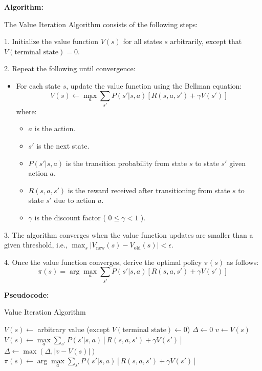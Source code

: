 \documentclass{article}
\begin{document}
\textbf{Algorithm:}

The Value Iteration Algorithm consists of the following steps:

1. Initialize the value function \( V(s) \) for all states \( s \) arbitrarily, except that \( V(\text{terminal state}) = 0 \).

2. Repeat the following until convergence:
   \begin{itemize}
       \item For each state \( s \), update the value function using the Bellman equation:
       \[
       V(s) \leftarrow \max_a \sum_{s'} P(s' | s, a) [R(s, a, s') + \gamma V(s')]
       \]
       where:
       \begin{itemize}
           \item \( a \) is the action.
           \item \( s' \) is the next state.
           \item \( P(s' | s, a) \) is the transition probability from state \( s \) to state \( s' \) given action \( a \).
           \item \( R(s, a, s') \) is the reward received after transitioning from state \( s \) to state \( s' \) due to action \( a \).
           \item \( \gamma \) is the discount factor ( \( 0 \leq \gamma < 1 \) ).
       \end{itemize}
   \end{itemize}

3. The algorithm converges when the value function updates are smaller than a given threshold, i.e., \( \max_s | V_{\text{new}}(s) - V_{\text{old}}(s) | < \epsilon \).

4. Once the value function converges, derive the optimal policy \( \pi(s) \) as follows:
   \[
   \pi(s) = \arg\max_a \sum_{s'} P(s' | s, a) [R(s, a, s') + \gamma V(s')]
   \]

\textbf{Pseudocode:}

\begin{algorithm}
\caption{Value Iteration Algorithm}
    \begin{algorithmic}[1]
             
                \State $V(s) \gets$ arbitrary value (except $V(\text{terminal state}) \gets 0$)
            \EndFor
            \Repeat
                \State $\Delta \gets 0$
                    \State $v \gets V(s)$
                    \State $V(s) \gets \max\limits_a \sum\limits_{s'} P(s' | s, a) [R(s, a, s') + \gamma V(s')]$
                    \State $\Delta \gets \max(\Delta, |v - V(s)|)$
                \EndFor
            \Until{$\Delta < \epsilon$}
             
                \State $\pi(s) \gets \arg\max\limits_a \sum\limits_{s'} P(s' | s, a) [R(s, a, s') + \gamma V(s')]$
            \EndFor
        \EndProcedure
    \end{algorithmic}
\end{algorithm}
\end{document}
